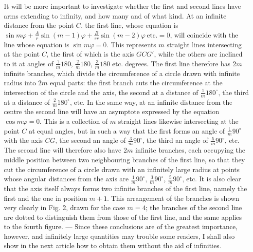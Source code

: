 It will be more important to investigate whether the first and second lines have arms extending to infinity, and how many and of what kind. At an infinite distance from the point $C$, the first line, whose equation is $\sin m\varphi+\frac{A}{r}\sin(m-1)\varphi+\frac{B}{rr}\sin(m-2)\varphi\ \text{etc.}=0$, will coincide with the line whose equation is $\sin m\varphi=0$. This represents $m$ straight lines intersecting at the point $C$, the first of which is the axis $GCG'$, while the others are inclined to it at angles of $\frac{1}{m}180$, $\frac{2}{m}180$, $\frac{3}{m}180$ etc. degrees. The first line therefore has $2m$ infinite branches, which divide the circumference of a circle drawn with infinite radius into $2m$ equal parts: the first branch cuts the circumference at the intersection of the circle and the axis, the second at a distance of $\frac{1}{m}180^{\circ}$, the third at a distance of $\frac{2}{m}180^{\circ}$, etc. In the same way, at an infinite distance from the centre the second line will have an asymptote expressed by the equation $\cos m\varphi=0$. This is a collection of $m$ straight lines likewise intersecting at the point $C$ at equal angles, but in such a way that the first forms an angle of $\frac{1}{m}90^{\circ}$ with the axis $CG$, the second an angle of $\frac{3}{m}90^{\circ}$, the third an angle of $\frac{5}{m}90^{\circ}$, etc. The second line will therefore also have $2m$ infinite branches, each occupying the middle position between two neighbouring branches of the first line, so that they cut the circumference of a circle drawn with an infinitely large radius at points whose angular distances from the axis are $\frac{1}{m}90^{\circ}$, $\frac{3}{m}90^{\circ}$, $\frac{5}{m}90^{\circ}$, etc. It is also clear that the axis itself always forms two infinite branches of the first line, namely the first and the one in position $m+1$. This arrangement of the branches is shown very clearly in Fig. 2, drawn for the case $m=4$; the branches of the second line are dotted to distinguish them from those of the first line, and the same applies to the fourth figure. --- Since these conclusions are of the greatest importance, however, and infinitely large quantities may trouble some readers, I shall also show in the next article how to obtain them without the aid of infinities.
